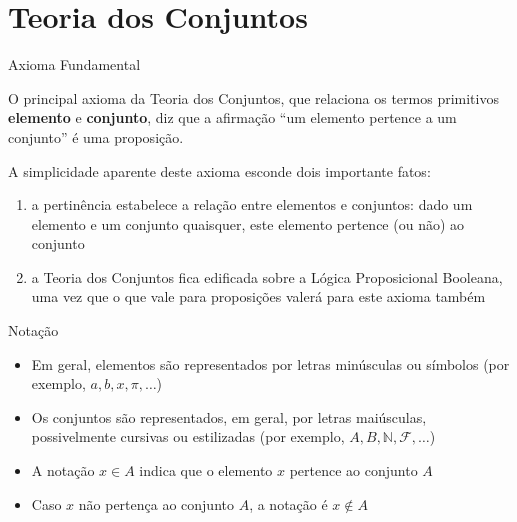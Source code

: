 \section*{Teoria dos Conjuntos}

\begin{frame}[fragile]{Axioma Fundamental}

O principal axioma da Teoria dos Conjuntos, que relaciona os termos primitivos \textbf{elemento} e \textbf{conjunto}, diz que a afirmação ``um elemento pertence a um conjunto'' é uma proposição.

\vspace{0.2in}

A simplicidade aparente deste axioma esconde dois importante fatos:
\begin{enumerate}
    \item a pertinência estabelece a relação entre elementos e conjuntos: dado um elemento e um conjunto quaisquer, este elemento pertence (ou não) ao conjunto
    \item a Teoria dos Conjuntos fica edificada sobre a Lógica Proposicional Booleana, uma vez que o que vale para proposições valerá para este axioma também
\end{enumerate}

\end{frame}

\begin{frame}[fragile]{Notação}

    \begin{itemize}
        \item Em geral, elementos são representados por letras minúsculas ou símbolos (por exemplo, $a, b, x, \pi, \ldots$)

        \item Os conjuntos são representados, em geral, por letras maiúsculas, possivelmente cursivas ou estilizadas (por exemplo, $A, B, \mathbb{N}, \mathcal{F}, \ldots$)

        \item A notação $x\in A$ indica que o elemento $x$ pertence ao conjunto $A$

        \item Caso $x$ não pertença ao conjunto $A$, a notação é $x\not\in A$
    \end{itemize}

\end{frame}

